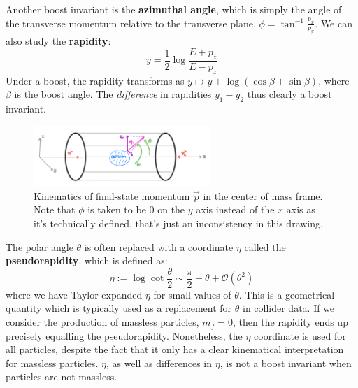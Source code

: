 \documentclass[11pt, oneside]{article}   	%
\theoremstyle{definition}
\numberwithin{equation}{subsection}		%
\begin{document}
Another boost invariant is the \textbf{azimuthal angle}, which is simply the angle of the transverse momentum 
relative to the transverse plane, $\phi = \tan^{-1}\frac{p_x}{p_y}$. We can also study the \textbf{rapidity}:
\begin{equation}
	y = \frac{1}{2}\log\frac{E + p_z}{E - p_z}
\end{equation}
Under a boost, the rapidity transforms as $y\mapsto y + \log(\cos\beta + \sin\beta)$, where $\beta$ is the boost angle. The \textit{difference} 
in rapidities $y_1 - y_2$ thus clearly a boost invariant. 

\begin{figure}[H]
	\centering
	\includegraphics[width = 0.6\textwidth]{collider_kinematics}
	\caption{Kinematics of final-state momentum $\vec p$ in the center of mass frame. Note that $\phi$ is taken to be 0 on the $y$ axis instead of the $x$ axis as it's 
	technically defined, that's just an inconsistency in this drawing.}
	\label{fig:kinematics}
\end{figure}

The polar angle $\theta$ is often replaced with a coordinate $\eta$ called the \textbf{pseudorapidity}, which is defined as:
\begin{equation}
	\eta := \log\cot\frac{\theta}{2}\sim\frac{\pi}{2} - \theta + \mathcal O(\theta^2)
\end{equation}
where we have Taylor expanded $\eta$ for small values of $\theta$. This is a geometrical quantity which is typically used as a replacement for 
$\theta$ in collider data. If we consider the production of massless particles, $m_f = 0$, then the rapidity ends up precisely equalling the 
pseudorapidity. Nonetheless, the $\eta$ coordinate is used for all particles, despite the fact that it only has a clear kinematical interpretation 
for massless particles. $\eta$, as well as differences in $\eta$, is not a boost invariant when particles are not massless. 
\end{document}

